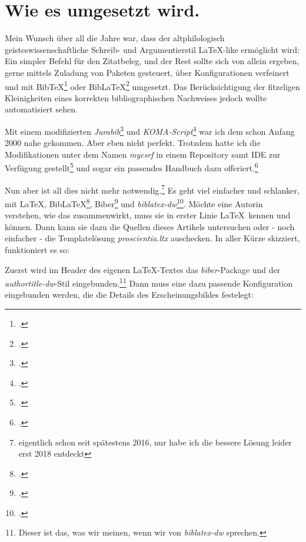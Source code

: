 
\section{Wie es umgesetzt wird.}

Mein Wunsch über all die Jahre war, dass der altphilologisch geisteswissenschaftliche Schreib- und Argumentierstil \LaTeX-like ermöglicht wird: Ein simpler Befehl für den Zitatbeleg, und der Rest sollte sich von allein
ergeben, gerne mittels Zuladung von Paketen gesteuert, über Konfigurationen
verfeinert und mit Bib\TeX\footcite[vgl.][]{BibtexOrgDe} oder Bib\LaTeX\footcite[vgl.][]{BibLaTeX2022a} umgesetzt. Das Berücksichtigung der fitzeligen Kleinigkeiten eines korrekten bibliographischen Nachweises jedoch wollte automatisiert sehen.

Mit einem modifizierten \emph{Jurabib}\footcite[vgl.][]{Berger2004a} und \emph{KOMA-Script}\footcite[vgl.][]{Kohm2008a} war ich dem schon Anfang 2000 nahe gekommen. Aber eben nicht perfekt. Trotzdem hatte ich die Modifikationen unter dem Namen \emph{mycsrf} in einem Repository samt IDE zur Verfügung gestellt\footcite[vgl.][]{Reincke2021a} und sogar ein passendes Handbuch dazu offeriert.\footcite[vgl.][]{Reincke2018a}

Nun aber ist all dies nicht mehr notwendig.\footnote{eigentlich schon seit spätestens 2016, nur habe ich die bessere Lösung leider erst 2018 entdeckt} Es geht viel einfacher und schlanker, mit \LaTeX, Bib\LaTeX\footcite[vgl.][]{BibLaTeX2022a},  Biber\footcite[vgl.][]{Biber2022a} und \emph{biblatex-dw}\footcite[vgl.][]{Waßenhoven2016a}. Möchte eine Autorin verstehen, wie das zusammenwirkt, muss sie in erster Linie \LaTeX\ kennen und können. Dann kann sie dazu die Quellen dieses Artikels untersuchen oder - noch einfacher - die Templatelösung \emph{proscientia.ltx} auschecken. In aller Kürze skizziert, funktioniert es so:

Zuerst wird im Header des eigenen \LaTeX-Textes das \emph{biber}-Package und der \emph{authortitle-dw}-Stil eingebunden.\footnote{Dieser ist das, was wir meinen, wenn wir von \emph{biblatex-dw} sprechen.} Dann muss eine dazu passende Konfiguration eingebunden werden, die die Details des Erscheinungsbildes festelegt:

